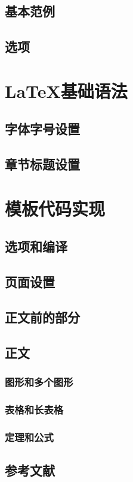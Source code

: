 \documentclass[bachelor,openright]{buaathesis}
\begin{document}
	\section{基本范例}
	\section{选项}
\chapter{LaTeX{}基础语法}
	\section{字体字号设置}
	\section{章节标题设置}
	
\chapter{模板代码实现}
	\section{选项和编译}
	\section{页面设置}
	\section{正文前的部分}
	\section{正文}
		\subsection{图形和多个图形}
		\subsection{表格和长表格}
		\subsection{定理和公式}
	\section{参考文献}
\end{document}
